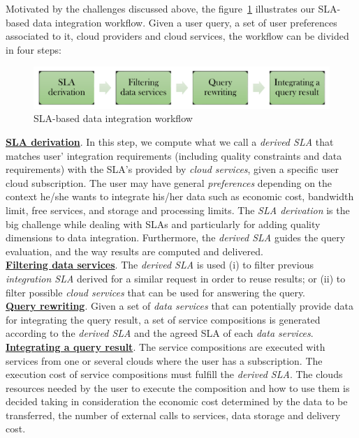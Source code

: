 Motivated by the challenges discussed above, the figure~\ref{fig:workflow} illustrates our SLA-based data integration workflow. Given a user query, a set of user preferences associated to it, cloud providers and cloud services, the workflow can be divided in four steps:

\begin{figure}[h!]
\center
\includegraphics[scale=0.50]{workflow-approach.pdf}
\caption{SLA-based data integration workflow}\label{fig:workflow}
\end{figure}

\noindent \textbf{\underline{SLA derivation}}. In this step, we compute what we call a \textsl{derived SLA} that matches user' integration requirements (including quality constraints and data requirements) with the SLA's provided by \textit{cloud services}, given a specific user cloud subscription. The user may have general \textit{preferences} depending on the context he/she wants to integrate his/her data such as economic cost, bandwidth limit, free services, and storage and processing limits. The \textit{SLA derivation} is the big challenge while dealing with SLAs and particularly for adding quality dimensions to data integration. Furthermore, the \textsl{derived SLA} guides the query evaluation, and the way results are computed and delivered. \\
\textbf{\underline{Filtering data services}}. The \textsl{derived SLA} is used (i)
to filter previous \textsl{integration SLA} derived for a similar request in order to reuse results; or (ii) to filter possible \textit{cloud services} that can be used for answering the query. \\ %
\textbf{\underline{Query rewriting}}. Given a set of \textit{data services} that can
potentially provide data for integrating the query result, a set of service compositions is generated according to the \textsl{derived SLA} and the agreed SLA of each \textit{data services}. \\
\textbf{\underline{Integrating a query result}}. The service compositions are
executed with services from one or several clouds where the user has a
subscription.
The execution cost of service compositions must fulfill the \textsl{derived
SLA}. The clouds resources needed by the user to execute the composition and how
to use them is decided taking in consideration the economic cost determined by
the data to be transferred, the number of external calls to services, data storage and delivery cost.

